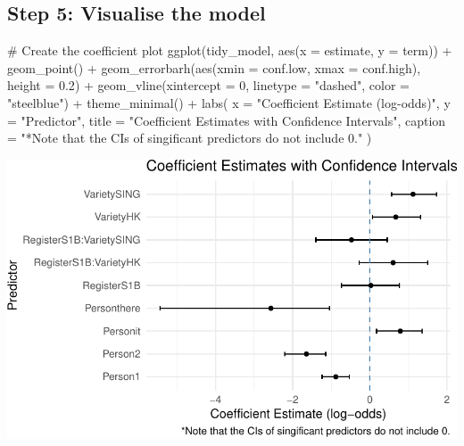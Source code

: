 \documentclass[
  11pt,
  letterpaper,
  DIV=11,
  numbers=noendperiod]{scrreprt}
\newenvironment{Shaded}{\begin{snugshade}}{\end{snugshade}}
\newcommand{\AttributeTok}[1]{\textcolor[rgb]{0.40,0.45,0.13}{#1}}
\newcommand{\CommentTok}[1]{\textcolor[rgb]{0.37,0.37,0.37}{#1}}
\newcommand{\DecValTok}[1]{\textcolor[rgb]{0.68,0.00,0.00}{#1}}
\newcommand{\FloatTok}[1]{\textcolor[rgb]{0.68,0.00,0.00}{#1}}
\newcommand{\FunctionTok}[1]{\textcolor[rgb]{0.28,0.35,0.67}{#1}}
\newcommand{\NormalTok}[1]{\textcolor[rgb]{0.00,0.23,0.31}{#1}}
\newcommand{\SpecialCharTok}[1]{\textcolor[rgb]{0.37,0.37,0.37}{#1}}
\newcommand{\StringTok}[1]{\textcolor[rgb]{0.13,0.47,0.30}{#1}}
\begin{document}
\subsection{Step 5: Visualise the
model}\label{step-5-visualise-the-model}

\begin{Shaded}
\begin{Highlighting}[]
\CommentTok{\# Create the coefficient plot}
\FunctionTok{ggplot}\NormalTok{(tidy\_model, }\FunctionTok{aes}\NormalTok{(}\AttributeTok{x =}\NormalTok{ estimate, }\AttributeTok{y =}\NormalTok{ term)) }\SpecialCharTok{+}
  \FunctionTok{geom\_point}\NormalTok{() }\SpecialCharTok{+}
  \FunctionTok{geom\_errorbarh}\NormalTok{(}\FunctionTok{aes}\NormalTok{(}\AttributeTok{xmin =}\NormalTok{ conf.low, }\AttributeTok{xmax =}\NormalTok{ conf.high), }\AttributeTok{height =} \FloatTok{0.2}\NormalTok{) }\SpecialCharTok{+}
  \FunctionTok{geom\_vline}\NormalTok{(}\AttributeTok{xintercept =} \DecValTok{0}\NormalTok{, }\AttributeTok{linetype =} \StringTok{"dashed"}\NormalTok{, }\AttributeTok{color =} \StringTok{"steelblue"}\NormalTok{) }\SpecialCharTok{+}
  \FunctionTok{theme\_minimal}\NormalTok{() }\SpecialCharTok{+}
  \FunctionTok{labs}\NormalTok{(}
    \AttributeTok{x =} \StringTok{"Coefficient Estimate (log{-}odds)"}\NormalTok{,}
    \AttributeTok{y =} \StringTok{"Predictor"}\NormalTok{,}
    \AttributeTok{title =} \StringTok{"Coefficient Estimates with Confidence Intervals"}\NormalTok{,}
    \AttributeTok{caption =} \StringTok{"*Note that the CIs of singificant predictors do not include 0."}
\NormalTok{  )}
\end{Highlighting}
\end{Shaded}

\includegraphics{Logistic_regression_files/figure-pdf/unnamed-chunk-12-1.pdf}
\end{document}
